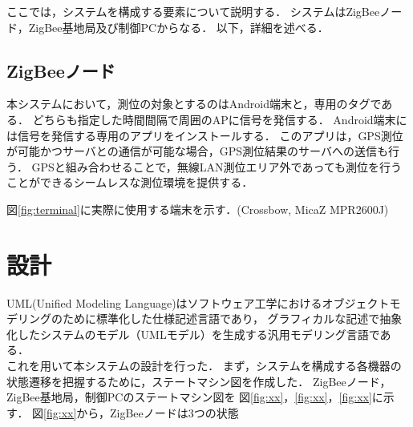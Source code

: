 \documentclass[12pt]{jreport}
\begin{document}
ここでは，システムを構成する要素について説明する．
システムはZigBeeノード，ZigBee基地局及び制御PCからなる．
以下，詳細を述べる．

\subsection{ZigBeeノード}

本システムにおいて，測位の対象とするのはAndroid端末と，専用のタグである．
どちらも指定した時間間隔で周囲のAPに信号を発信する．
Android端末には信号を発信する専用のアプリをインストールする．
このアプリは，GPS測位が可能かつサーバとの通信が可能な場合，GPS測位結果のサーバへの送信も行う．
GPSと組み合わせることで，無線LAN測位エリア外であっても測位を行うことができるシームレスな測位環境を提供する．

図\ref{fig:terminal}に実際に使用する端末を示す．(Crossbow, MicaZ MPR2600J)



\section{設計}
UML(Unified Modeling Language)はソフトウェア工学におけるオブジェクトモデリングのために標準化した仕様記述言語であり，
グラフィカルな記述で抽象化したシステムのモデル（UMLモデル）を生成する汎用モデリング言語である．\\
これを用いて本システムの設計を行った．
まず，システムを構成する各機器の状態遷移を把握するために，ステートマシン図を作成した．
ZigBeeノード，ZigBee基地局，制御PCのステートマシン図を
図\ref{fig:xx}，\ref{fig:xx}，\ref{fig:xx}に示す．
図\ref{fig:xx}から，ZigBeeノードは3つの状態
\end{document}
